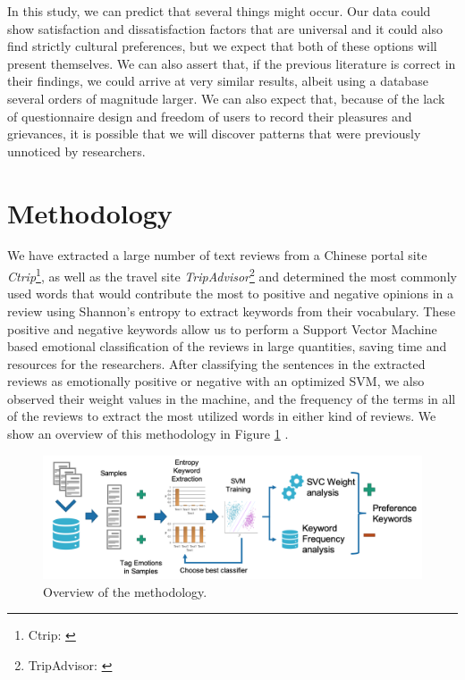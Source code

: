 In this study, we can predict that several things might occur. Our data could show satisfaction and dissatisfaction factors that are universal and it could also find strictly cultural preferences, but we expect that both of these options will present themselves. We can also assert that, if the previous literature is correct in their findings, we could arrive at very similar results, albeit using a database several orders of magnitude larger. We can also expect that, because of the lack of questionnaire design and freedom of users to record their pleasures and grievances, it is possible that we will discover patterns that were previously unnoticed by researchers.

\section{Methodology}\label{method}

We have extracted a large number of text reviews from a Chinese portal site \textit{Ctrip}\footnote{\label{ctrip}Ctrip: \href {www.ctrip.com/}{}}, as well as the travel site \textit{TripAdvisor}\footnote{\label{tripadvisor}TripAdvisor: \href {www.tripadvisor.com/}{}} and determined the most commonly used words that would contribute the most to positive and negative opinions in a review using Shannon's entropy to extract keywords from their vocabulary. These positive and negative keywords allow us to perform a Support Vector Machine based emotional classification of the reviews in large quantities, saving time and resources for the researchers. After classifying the sentences in the extracted reviews as emotionally positive or negative with an optimized SVM, we also observed their weight values in the machine, and the frequency of the terms in all of the reviews to extract the most utilized words in either kind of reviews. We show an overview of this methodology in Figure \ref{fig:method-overview} \cite[][]{Aleman2018ICAROB}.

\begin{figure}[bp]
\centering
\includegraphics[width=\textwidth]{emotion-method-overview.png}
\caption{Overview of the methodology.}
\label{fig:method-overview}
\end{figure}

